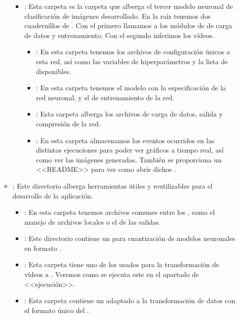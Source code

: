 \begin{itemize}
\begin{itemize}
\begin{itemize}
                  \item {}: Esta carpeta es la carpeta que alberga el tercer modelo neuronal de clasificación de imágenes desarrollado. En la raíz tenemos dos cuadernillos de . Con el primero llamamos a los módulos de  de carga de datos y entrenamiento. Con el segundo inferimos los vídeos.
                        \begin{itemize}
                          \item {}: En esta carpeta tenemos los archivos de configuración únicos a esta red, así como las variables de hiperparámetros y la lista de  disponibles.
                          \item {}: En esta carpeta tenemos el modelo con la especificación de la red neuronal, y el  de entrenamiento de la red.
                          \item {}: Esta carpeta alberga los archivos de carga de datos, salida y compresión de la red.
                          \item {}: En esta carpeta almacenamos los eventos ocurridos en las distintas ejecuciones para poder ver gráficos a tiempo real, así como ver las imágenes generadas. También se proporciona un <<README>> para ver como abrir dichos .
                        \end{itemize}
                \end{itemize}

          \item {}: Este directorio alberga herramientas útiles y reutilizables para el desarrollo de la aplicación.
                \begin{itemize}
                  \item {}: En esta carpeta tenemos archivos comunes entre los , como el manejo de archivos locales o el  de las salidas.

                  \item {}: Este directorio contiene un  para cuantización de modelos neuronales en formato .

                  \item {}: Esta carpeta tiene uno de los  usados para la transformación de vídeos a . Veremos como se ejecuta este  en el apartado de <<ejecución>>.

                  \item {}: Esta carpeta contiene un  adaptado a la transformación de datos con el formato único del   .
                \end{itemize}
        \end{itemize}

\end{itemize}

